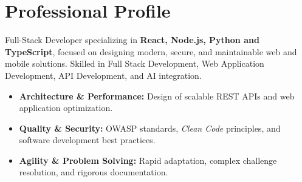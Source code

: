 
\section{Professional Profile}

Full-Stack Developer specializing in \textbf{React, Node.js, Python and TypeScript}, focused on designing modern, secure, and maintainable web and mobile solutions. Skilled in Full Stack Development, Web Application Development, API Development, and AI integration.

\begin{itemize}[leftmargin=*, itemsep=1pt]
    \item \textbf{Architecture \& Performance:} Design of scalable REST APIs and web application optimization.
    \item \textbf{Quality \& Security:} OWASP standards, \textit{Clean Code} principles, and software development best practices.
    \item \textbf{Agility \& Problem Solving:} Rapid adaptation, complex challenge resolution, and rigorous documentation.
\end{itemize}
